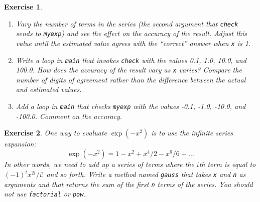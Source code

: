 \documentclass[12pt]{book}
\theoremstyle{exercise}
\newtheorem{exercise}{Exercise}[chapter]
\begin{document}
\begin{exercise}
\begin{enumerate}
\item Vary the number of terms in the series (the second argument that {\tt check} sends to {\tt myexp}) and see the effect on
the accuracy of the result.
Adjust this value until the estimated value agrees with the ``correct'' answer when {\tt x} is 1.

\item Write a loop in {\tt main} that invokes {\tt check} with the values 0.1, 1.0, 10.0, and 100.0.
How does the accuracy of the result vary as {\tt x} varies?
Compare the number of digits of agreement rather than the difference between the actual and estimated values.

\item Add a loop in {\tt main} that checks {\tt myexp} with the values -0.1, -1.0, -10.0, and -100.0.
Comment on the accuracy.

\end{enumerate}
\end{exercise}


\begin{exercise}
One way to evaluate $\exp(-x^2)$ is to use the infinite series expansion:
%
\begin{equation*}
\exp(-x^2) = 1 - x^2 + x^4/2 - x^6/6 + \ldots
\end{equation*}
%
In other words, we need to add up a series of terms where the $i$th term is equal to $(-1)^i x^{2i} / i!$ and so forth.
Write a method named {\tt gauss} that takes {\tt x} and {\tt n} as arguments and that returns the sum of the first {\tt n} terms of the series.
You should not use {\tt factorial} or {\tt pow}.
\end{exercise}
\end{document}
